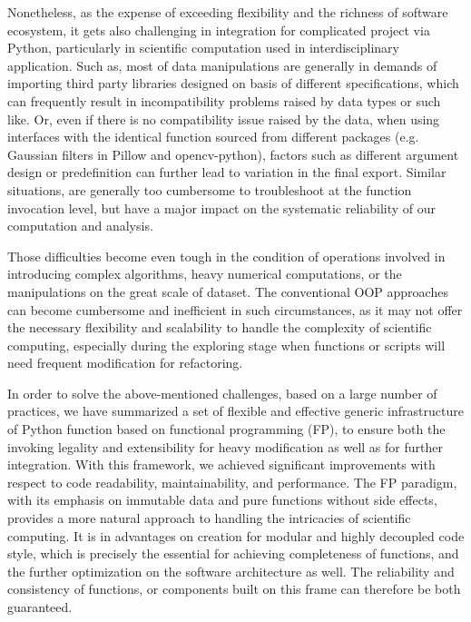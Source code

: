 \documentclass[a4paper,12pt]{article}
\newcommand{\mycite}[1]{{\color{black}\cite{#1}}}
\begin{document}
Nonetheless, as the expense of exceeding flexibility and the richness of software ecosystem, it gets also challenging in integration for complicated project via Python, particularly in scientific computation used in interdisciplinary application\mycite{oliphant2007python, perez2010python, turner2018applied, oxvig2016storing}. Such as, most of data manipulations are generally in demands of importing third party libraries designed on basis of different specifications, which can frequently result in incompatibility problems raised by data types or such like. Or, even if there is no compatibility issue raised by the data, when using interfaces with the identical function sourced from different packages (e.g. Gaussian filters in Pillow and opencv-python), factors such as different argument design or predefinition can further lead to variation in the final export. Similar situations, are generally too cumbersome to troubleshoot at the function invocation level, but have a major impact on the systematic reliability of our computation and analysis.\par

Those difficulties become even tough in the condition of operations involved in introducing complex algorithms, heavy numerical computations, or the manipulations on the great scale of dataset\mycite{cielen2016introducing, rodriguez2016general}. The conventional OOP approaches can become cumbersome and inefficient in such circumstances, as it may not offer the necessary flexibility and scalability to handle the complexity of scientific computing, especially during the exploring stage when functions or scripts will need frequent modification for refactoring.\par

In order to solve the above-mentioned challenges, based on a large number of practices, we have summarized a set of flexible and effective generic infrastructure of Python function based on functional programming (FP), to ensure both the invoking legality and extensibility for heavy modification as well as for further integration. With this framework, we achieved significant improvements with respect to code readability, maintainability, and performance. The FP paradigm, with its emphasis on immutable data and pure functions without side effects\mycite{gabbrielli2023functional, sarcar2023functional, hudak1989conception, alic2016comparative}, provides a more natural approach to handling the intricacies of scientific computing. It is in advantages on creation for modular and highly decoupled code style, which is precisely the essential for achieving completeness of functions, and the further optimization on the software architecture as well. The reliability and consistency of functions, or components built on this frame can therefore be both guaranteed.\par
\end{document}

